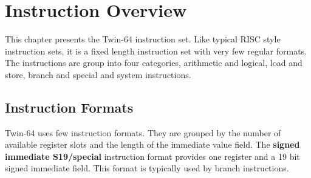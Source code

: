 %
%
\section*{Instruction Overview}

This chapter presents the Twin-64 instruction set. Like typical RISC style instruction sets, it is a fixed length instruction set with very few regular formats. The instructions are group into four categories, arithmetic and logical, load and store, branch and special and system instructions.

\subsection*{Instruction Formats}

Twin-64 uses few instruction formats. They are grouped by the number of available register slots and the length of the immediate value field. The \textbf{signed immediate S19/special} instruction format provides one register and a 19 bit signed immediate field. This format is typically used by branch instructions.

\begin{figure}[H]
\begin{center}
\end{center}
\end{figure}

